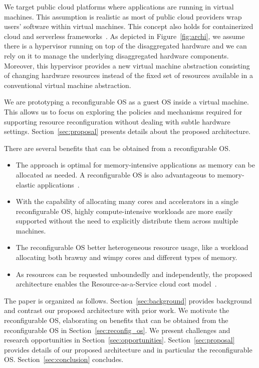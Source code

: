 We target public cloud platforms where applications are
running in virtual machines. This assumption is realistic as most
of public cloud providers wrap users' software within virtual
machines. This concept also holds for containerized cloud and
serverless frameworks~\cite{agache2020firecracker}. As depicted in
Figure~\ref{fig:archi}, we assume there is a hypervisor running on
top of the disaggregated hardware and we can rely on it to manage
the underlying disaggregated hardware components. Moreover, this
hypervisor provides a new virtual machine abstraction consisting
of changing hardware resources instead of the fixed set of resources
available in a conventional virtual machine abstraction.

We are prototyping a reconfigurable OS as a guest OS inside
a virtual machine. This allows us to focus on exploring the policies
and mechanisms required for supporting resource reconfiguration
without dealing with subtle hardware settings.
Section~\ref{sec:proposal} presents details about the
proposed architecture.

There are several benefits that can be obtained from
a reconfigurable OS.
\begin{itemize}
\item The approach is optimal for memory-intensive applications as
memory can be allocated as needed.  A reconfigurable OS is also
advantageous to memory-elastic applications~\cite{funaro2020memory}.
\item With the capability of allocating many cores and accelerators
in a single reconfigurable OS, highly compute-intensive
workloads are more easily supported without the need to
explicitly distribute them across multiple machines.
\item The reconfigurable OS better heterogeneous resource usage,
like a workload allocating both brawny and wimpy cores and
different types of memory.
\item As resources can be requested unboundedly and independently,
the proposed architecture enables the Resource-as-a-Service
cloud cost model~\cite{ben2012resource}.
\end{itemize}

The paper is organized as follows.  Section~\ref{sec:background}
provides background and contrast our proposed architecture with
prior work.  We motivate the reconfigurable OS, elaborating on
benefits that can be obtained from the reconfigurable OS in
Section~\ref{sec:reconfig_os}.  We present challenges and research
opportunities in Section~\ref{sec:opportunities}.
Section~\ref{sec:proposal} provides details of our proposed
architecture and in particular the reconfigurable OS.
Section~\ref{sec:conclusion} concludes.
 
